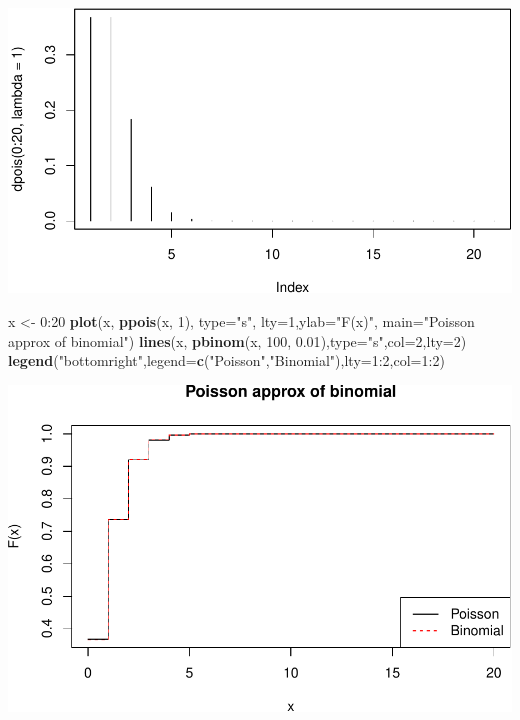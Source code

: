 \documentclass[]{article}
\newenvironment{Shaded}{\begin{snugshade}}{\end{snugshade}}
\newcommand{\KeywordTok}[1]{\textcolor[rgb]{0.13,0.29,0.53}{\textbf{{#1}}}}
\newcommand{\DataTypeTok}[1]{\textcolor[rgb]{0.13,0.29,0.53}{{#1}}}
\newcommand{\DecValTok}[1]{\textcolor[rgb]{0.00,0.00,0.81}{{#1}}}
\newcommand{\FloatTok}[1]{\textcolor[rgb]{0.00,0.00,0.81}{{#1}}}
\newcommand{\StringTok}[1]{\textcolor[rgb]{0.31,0.60,0.02}{{#1}}}
\newcommand{\NormalTok}[1]{{#1}}
\begin{document}
\includegraphics{probability_files/figure-latex/unnamed-chunk-15-1.pdf}

\begin{Shaded}
\begin{Highlighting}[]
\NormalTok{x <-}\StringTok{ }\DecValTok{0}\NormalTok{:}\DecValTok{20}
\KeywordTok{plot}\NormalTok{(x, }\KeywordTok{ppois}\NormalTok{(x, }\DecValTok{1}\NormalTok{), }\DataTypeTok{type=}\StringTok{"s"}\NormalTok{, }\DataTypeTok{lty=}\DecValTok{1}\NormalTok{,}\DataTypeTok{ylab=}\StringTok{"F(x)"}\NormalTok{, }\DataTypeTok{main=}\StringTok{"Poisson approx of binomial"}\NormalTok{)}
\KeywordTok{lines}\NormalTok{(x, }\KeywordTok{pbinom}\NormalTok{(x, }\DecValTok{100}\NormalTok{, }\FloatTok{0.01}\NormalTok{),}\DataTypeTok{type=}\StringTok{"s"}\NormalTok{,}\DataTypeTok{col=}\DecValTok{2}\NormalTok{,}\DataTypeTok{lty=}\DecValTok{2}\NormalTok{)}
\KeywordTok{legend}\NormalTok{(}\StringTok{"bottomright"}\NormalTok{,}\DataTypeTok{legend=}\KeywordTok{c}\NormalTok{(}\StringTok{"Poisson"}\NormalTok{,}\StringTok{"Binomial"}\NormalTok{),}\DataTypeTok{lty=}\DecValTok{1}\NormalTok{:}\DecValTok{2}\NormalTok{,}\DataTypeTok{col=}\DecValTok{1}\NormalTok{:}\DecValTok{2}\NormalTok{)}
\end{Highlighting}
\end{Shaded}

\includegraphics{probability_files/figure-latex/unnamed-chunk-15-2.pdf}
\end{document}
